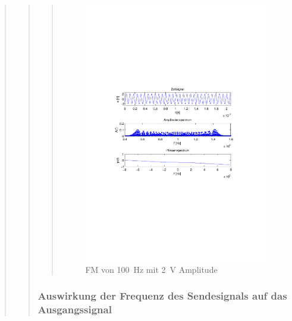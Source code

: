 \begin{quote}
\begin{quote}
\begin{quote}
            \begin{figure}[H]
            \centering
                \includegraphics[scale=0.7, trim = 35mm 100mm 35mm 95mm, clip]{Bilder/f100_2}
                    \caption{FM von \SI{100}{\hertz} mit \SI{2}{\volt} Amplitude}
                    \label{fig:f100_2}
            \end{figure}
            
            
            
        \end{quote}

        \subsubsection{Auswirkung der Frequenz des Sendesignals auf das Ausgangssignal}
        \begin{quote}
            

\end{quote}
\end{quote}
\end{quote}
